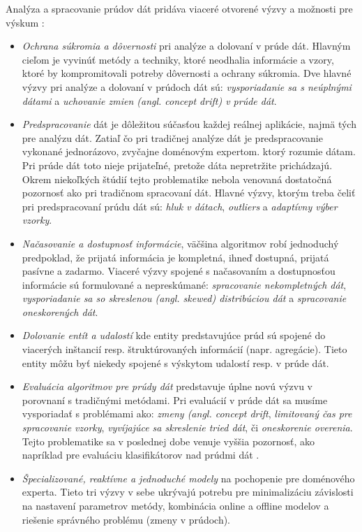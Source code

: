 Analýza a spracovanie prúdov dát pridáva viaceré otvorené výzvy a možnosti pre výskum \citep{krempl2014open}:
\begin{itemize}
	\item \textit{Ochrana súkromia a dôvernosti} pri analýze a dolovaní v prúde dát. Hlavným cieľom je vyvinúť metódy a techniky, ktoré neodhalia informácie a vzory, ktoré by kompromitovali potreby dôvernosti a ochrany súkromia. Dve hlavné výzvy pri analýze a dolovaní v prúdoch dát sú: \textit{vysporiadanie sa s neúplnými dátami} a \textit{uchovanie zmien (angl. concept drift) v prúde dát}.
	\item \textit{Predspracovanie} dát je dôležitou súčasťou každej reálnej aplikácie, najmä tých pre analýzu dát. Zatiaľ čo pri tradičnej analýze dát je predspracovanie vykonané jednorázovo, zvyčajne doménovým expertom. ktorý rozumie dátam. Pri prúde dát toto nieje prijateľné, pretože dáta nepretržite prichádzajú. Okrem niekoľkých štúdií \citep{zliobaite2014adaptive, anagnostopoulos2008deciding} tejto problematike nebola venovaná dostatočná pozornosť ako pri tradičnom spracovaní dát. Hlavné výzvy, ktorým treba čeliť pri predspracovaní prúdu dát sú: \textit{hluk v dátach}, \textit{outliers} a \textit{adaptívny výber vzorky}.
	\item \textit{Načasovanie a dostupnosť informácie}, väčšina algoritmov robí jednoduchý predpoklad, že prijatá informácia je kompletná, ihneď dostupná, prijatá pasívne a zadarmo. Viaceré výzvy spojené s načasovaním a dostupnosťou informácie sú formulované a nepreskúmané: \textit{spracovanie nekompletných dát}, \textit{vysporiadanie sa so skreslenou (angl. skewed) distribúciou dát} a \textit{spracovanie oneskorených dát}.
	\item \textit{Dolovanie entít a udalostí} kde entity predstavujúce prúd sú spojené do viacerých inštancií resp. štruktúrovaných informácií (napr. agregácie). Tieto entity môžu byť niekedy spojené s výskytom udalostí resp. v prúde dát. 
	\item \textit{Evaluácia algoritmov pre prúdy dát} predstavuje úplne novú výzvu v porovnaní s tradičnými metódami. Pri evaluácií v prúde dát sa musíme vysporiadať s problémami ako: \textit{zmeny (angl. concept drift}, \textit{limitovaný čas pre spracovanie vzorky}, \textit{vyvíjajúce sa skreslenie tried dát}, či \textit{oneskorenie overenia}. Tejto problematike sa v poslednej dobe venuje vyššia pozornosť, ako napríklad pre evaluáciu klasifikátorov nad prúdmi dát \citep{bifet2015efficient}.
	\item \textit{Špecializované, reaktívne a jednoduché modely} na pochopenie pre doménového experta. Tieto tri výzvy v sebe ukrývajú potrebu pre minimalizáciu závislosti na nastavení parametrov metódy, kombinácia online a offline modelov a riešenie správného problému (zmeny v prúdoch).
\end{itemize}


